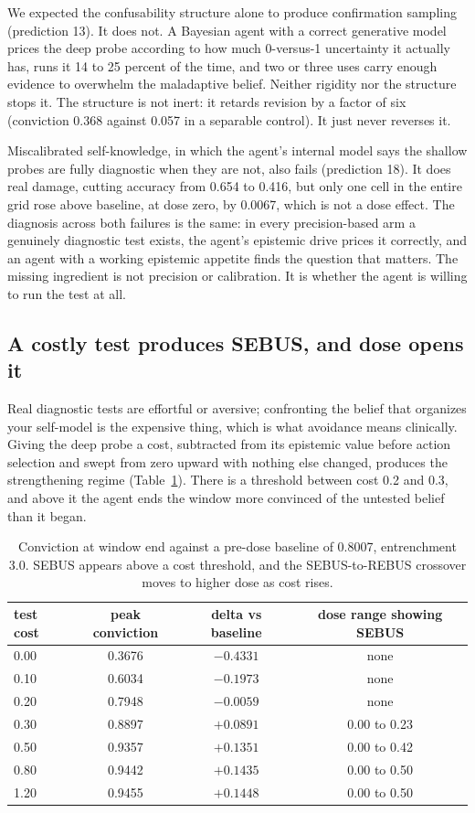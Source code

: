 \documentclass[11pt]{article}
\begin{document}
We expected the confusability structure alone to produce confirmation sampling
(prediction 13). It does not. A Bayesian agent with a correct generative model prices
the deep probe according to how much 0-versus-1 uncertainty it actually has, runs it
14 to 25 percent of the time, and two or three uses carry enough evidence to
overwhelm the maladaptive belief. Neither rigidity nor the structure stops it. The
structure is not inert: it retards revision by a factor of six (conviction 0.368
against 0.057 in a separable control). It just never reverses it.

Miscalibrated self-knowledge, in which the agent's internal model says the shallow
probes are fully diagnostic when they are not, also fails (prediction 18). It does
real damage, cutting accuracy from 0.654 to 0.416, but only one cell in the entire
grid rose above baseline, at dose zero, by 0.0067, which is not a dose effect. The
diagnosis across both failures is the same: in every precision-based arm a genuinely
diagnostic test exists, the agent's epistemic drive prices it correctly, and an agent
with a working epistemic appetite finds the question that matters. The missing
ingredient is not precision or calibration. It is whether the agent is willing to run
the test at all.

\subsection{A costly test produces SEBUS, and dose opens it}

Real diagnostic tests are effortful or aversive; confronting the belief that
organizes your self-model is the expensive thing, which is what avoidance means
clinically. Giving the deep probe a cost, subtracted from its epistemic value before
action selection and swept from zero upward with nothing else changed, produces the
strengthening regime (Table~\ref{tab:cost}). There is a threshold between cost 0.2
and 0.3, and above it the agent ends the window more convinced of the untested belief
than it began.

\begin{table}[t]
\centering
\caption{Conviction at window end against a pre-dose baseline of 0.8007,
entrenchment 3.0. SEBUS appears above a cost threshold, and the SEBUS-to-REBUS
crossover moves to higher dose as cost rises.}
\label{tab:cost}
\begin{tabular}{lccc}
\toprule
test cost & peak conviction & delta vs baseline & dose range showing SEBUS \\
\midrule
0.00 & 0.3676 & $-0.4331$ & none \\
0.10 & 0.6034 & $-0.1973$ & none \\
0.20 & 0.7948 & $-0.0059$ & none \\
0.30 & 0.8897 & $+0.0891$ & 0.00 to 0.23 \\
0.50 & 0.9357 & $+0.1351$ & 0.00 to 0.42 \\
0.80 & 0.9442 & $+0.1435$ & 0.00 to 0.50 \\
1.20 & 0.9455 & $+0.1448$ & 0.00 to 0.50 \\
\bottomrule
\end{tabular}
\end{table}
\end{document}
